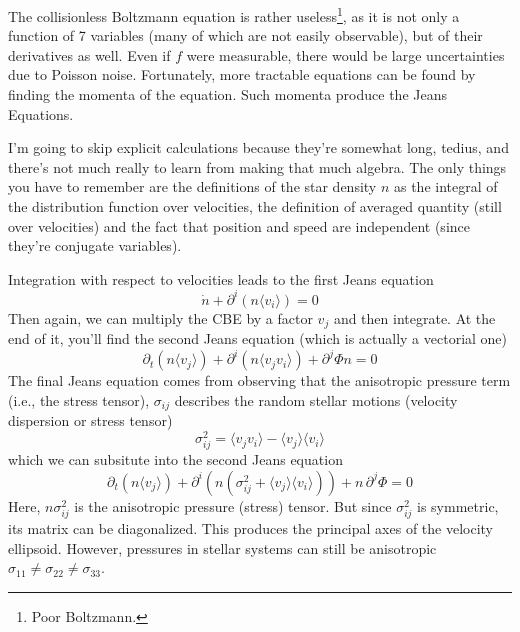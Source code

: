 The collisionless Boltzmann equation is rather useless\footnote{Poor Boltzmann.}, as it is not only a function of 7 variables (many of which are not easily observable), but of their derivatives as well. Even if $f$ were measurable, there would be large uncertainties due to Poisson noise. Fortunately, more tractable equations can be found by finding the momenta of the equation. Such momenta produce the Jeans Equations.
\par I'm going to skip explicit calculations because they're somewhat long, tedius, and there's not much really to learn from making that much algebra. The only things you have to remember are the definitions of the star density $n$ as the integral of the distribution function over velocities, the definition of averaged quantity (still over velocities) and the fact that position and speed are independent (since they're conjugate variables).
\par Integration with respect to velocities leads to the first Jeans equation
\begin{equation}
    \dot{n}+\partial^{i}(n\langle v_{i}\rangle) = 0
    \label{eq:jeans_1st}
\end{equation}
Then again, we can multiply the CBE by a factor $v_{j}$ and then integrate. At the end of it, you'll find the second Jeans equation (which is actually a vectorial one)
\begin{equation}
    \partial_{t}(n\langle v_{j}\rangle ) + \partial^{i}\left(n\langle v_{j}v_{i}\rangle \right)+\partial^{j}\Phi n = 0
    \label{eq:jeans_2nd}
\end{equation}
The final Jeans equation comes from observing that the anisotropic pressure term (i.e., the stress tensor), $\sigma_{ij}$ describes the random stellar motions (velocity dispersion or stress tensor)
\begin{equation}
    \sigma_{ij}^{2} = \langle v_{j}v_{i}\rangle - \langle v_{j}\rangle\langle v_{i}\rangle
    \label{eq:anisotropic_pressure}
\end{equation}
which we can subsitute into the second Jeans equation
\begin{equation}
    \partial_{t}(n\langle v_{j}\rangle ) + \partial^{i}\left(n( \sigma_{ij}^{2} + \langle v_{j}\rangle\langle v_{i}\rangle ) \right)+n\,\partial^{j}\Phi = 0
    \label{eq:jeans_anisotropic}
\end{equation}
Here, $n\sigma_{ij}^{2}$ is the anisotropic pressure (stress) tensor. But since $\sigma_{ij}^{2}$ is symmetric, its matrix can be diagonalized. This produces the principal axes of the velocity ellipsoid. However, pressures in stellar systems can still be anisotropic $\sigma_{11}\neq \sigma_{22}\neq \sigma_{33}$.
